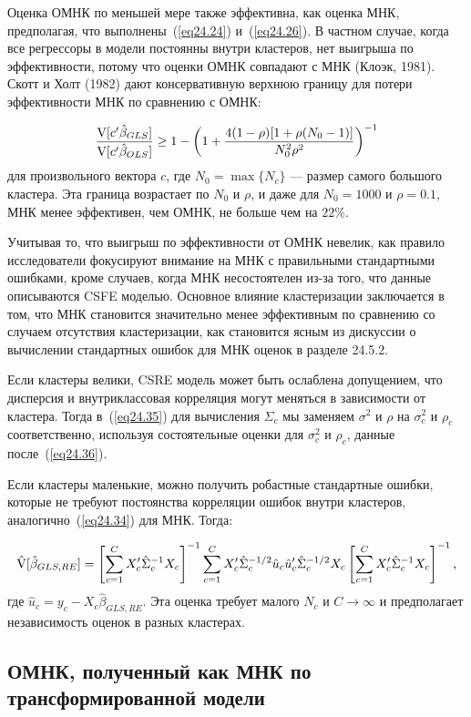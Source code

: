 Оценка ОМНК по меньшей мере также эффективна, как оценка МНК, предполагая, что выполнены~(\ref{eq24.24}) и~(\ref{eq24.26}). В частном случае, когда все регрессоры в модели постоянны внутри кластеров, нет выигрыша по эффективности, потому что оценки ОМНК совпадают с МНК (Клоэк, 1981). Скотт и Холт (1982) дают консервативную верхнюю границу для потери эффективности МНК по сравнению с ОМНК:

$$
\frac{\mathrm{V}[c' \hat \beta_{GLS}]}{\mathrm{V}[c' \hat \beta_{OLS}]} \ge 1 - \left( 1+ \frac{4(1-\rho)[1+\rho(N_0 -1)]}{N_0^2 \rho^2} \right)^{-1}
$$
для произвольного вектора $c$, где $N_0 = \max\{ N_c\}$ --- размер самого большого кластера. Эта граница возрастает по $N_0$ и $\rho$, и даже для $N_0 = 1000$ и $\rho = 0.1$, МНК менее эффективен, чем ОМНК, не больше чем на $22\%$. 

Учитывая то, что выигрыш по эффективности от ОМНК невелик, как правило исследователи фокусируют внимание на МНК с правильными стандартными ошибками, кроме случаев, когда МНК несостоятелен из-за того, что данные описываются CSFE моделью. Основное влияние кластеризации заключается в том, что МНК становится значительно менее эффективным по сравнению со случаем отсутствия кластеризации, как становится ясным из дискуссии о вычислении стандартных ошибок для МНК оценок в разделе 24.5.2. 

Если кластеры велики, CSRE модель может быть ослаблена допущением, что дисперсия и внутриклассовая корреляция могут меняться в зависимости от кластера. Тогда в~(\ref{eq24.35}) для вычисления $\Sigma_c$ мы заменяем $\sigma^2$ и $\rho$ на $\sigma^2_c$ и $\rho_c$ соответственно, используя состоятельные оценки для $\sigma^2_c$ и $\rho_c$, данные после~(\ref{eq24.36}). 

Если кластеры маленькие, можно получить робастные стандартные ошибки, которые не требуют постоянства корреляции ошибок внутри кластеров, аналогично~(\ref{eq24.34}) для МНК. Тогда:

$$
\hat {\mathrm{V}} [\hat \beta_{GLS,RE}] = \left[ \sum_{c=1}^C X'_c \hat \Sigma_c^{-1} X_c \right]^{-1} \sum_{c=1}^C  X'_c \hat \Sigma_c^{-1/2} \hat u_c \hat u'_c \hat \Sigma_c^{-1/2} X_c \left[ \sum_{c=1}^C X'_c \hat \Sigma_c^{-1} X_c \right]^{-1},
$$
где $\hat u_c = y_c - X_c \hat \beta_{GLS,RE}$. Эта оценка требует малого $N_c$ и $C \to \infty$ и предполагает независимость оценок в разных кластерах. 

\subsection*{ОМНК, полученный как МНК по трансформированной модели}

